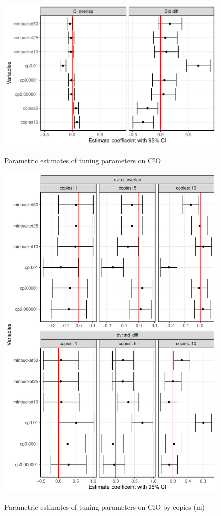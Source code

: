 \documentclass[12pt]{article}
\begin{document}
\begin{figure}[!h]
    \centering
    \caption{Parametric estimates of tuning parameters on CIO}
    \includegraphics{../graphs/synthpop/graph_synthpop_cio.pdf}
    \label{graph_synthpop_cio}
\end{figure}

\begin{figure}[!h]
    \centering
    \caption{Parametric estimates of tuning parameters on CIO by copies (m)}
    \includegraphics{../graphs/synthpop/graph_synthpop_cio_facet.pdf}
    \label{graph_synthpop_cio_facet}
\end{figure}
\end{document}

